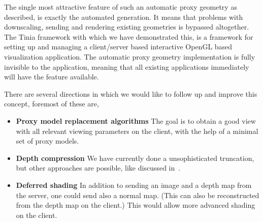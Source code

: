 The single most attractive feature of such an automatic proxy geometry as
described, is exactly the automated generation. It means that problems with
downscaling, sending and rendering existing geometries is bypassed
altogether. The Tinia framework with which we have demonstrated this, is a
framework for setting up and managing a client/server based interactive OpenGL
based visualization application. The automatic proxy geometry implementation is
fully invisible to the application, meaning that all existing applications
immediately will have the feature available.

There are several directions in which we would like to follow up and improve
this concept, foremost of these are,
\begin{itemize}

\item \textbf{Proxy model replacement algorithms} The goal is to obtain a good view with
all relevant viewing parameters on the client, with the help of a minimal set of
proxy models.



\item \textbf{Depth compression} We have currently done a unsophisticated
truncation, but other approaches are possible,
like discussed in~\cite{DBLP:journals/tvcg/Lindstrom14}.


\item \textbf{Deferred shading} In addition to sending an image and a depth map
from the server, one could send also a normal map. (This can also be
reconstructed from the depth map on the client.) This would allow more advanced
shading on the client.


\end{itemize}





%






